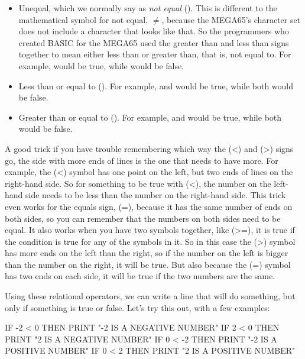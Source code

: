 \begin{itemize}
\item Unequal, which we normally say as {\em not equal}
  (\stw{<>}). This is different to the mathematical symbol for not
  equal, $\ne$, because the MEGA65's character set does not include a
  character that looks like that. So the programmers who created BASIC
  for the MEGA65 used the greater than and less than signs together
  to mean either less than or greater than, that is, not equal to.
  For example,  would be true,
    while  would be false.
  \item Less than or equal to (\stw{<=}). For example,  and
     would be true,
    while both  would be false.
  \item Greater than or equal to (\stw{>=}). For example, 
    and  would be
    true, while both  would be false.
\end{itemize}

A good trick if you have trouble remembering which way the \stw(<) and \stw(>)
signs go, the side with more ends of lines is the one that needs to
have more. For example, the \stw(<) symbol has one point on the left, but
two ends of lines on the right-hand side.  So for something to be true
with \stw(<), the number on the left-hand side needs to be less than the number
on the right-hand side.  This trick even works for the equals sign, \stw(=),
because it has the same number of ends on both sides, so you can
remember that the numbers on both sides need to be equal.  It also
works when you have two symbols together, like \stw(>=), it is true if
the condition is true for any of the symbols in it. So in this case
the \stw(>) symbol has more ends on the left than the right, so if the
number on the left is bigger than the number on the right, it will be
true. But also because the \stw(=) symbol has two ends on each side,
it will be true if the two numbers are the same.

\needspace{2cm}
Using these relational operators, we can write a line that will do
something, but only if something is true or false.  Let's try this
out, with a few examples:

\begin{screenoutput}
  IF -2 < 0 THEN PRINT "-2 IS A NEGATIVE NUMBER"
  IF 2 < 0 THEN PRINT "2 IS A NEGATIVE NUMBER"
  IF 0 < -2 THEN PRINT "-2 IS A POSITIVE NUMBER"
  IF 0 < 2 THEN PRINT "2 IS A POSITIVE NUMBER"
\end{screenoutput}

